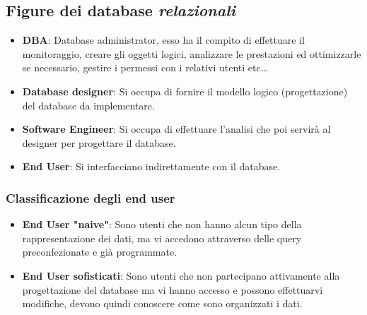 \documentclass[a4paper,12pt]{report}
\begin{document}
\subsection{Figure dei database \textit{relazionali}}
\begin{itemize}
	\item \textbf{DBA}: Database administrator, esso ha il compito di effettuare il monitoraggio, creare gli oggetti logici, analizzare le prestazioni ed ottimizzarle se necessario, gestire i permessi con i relativi utenti etc\dots
	\item \textbf{Database designer}: Si occupa di fornire il modello logico (progettazione) del database da implementare.
	\item \textbf{Software Engineer}: Si occupa di effettuare l'analisi che poi servirà al designer per progettare il database.
	\item \textbf{End User}: Si interfacciano indirettamente con il database.
\end{itemize}
\subsubsection{Classificazione degli end user}
\begin{itemize}
	\item \textbf{End User "naive"}: Sono utenti che non hanno alcun tipo della rappresentazione dei dati, ma vi accedono attraverso delle query preconfezionate e già programmate.
	\item \textbf{End User sofisticati}: Sono utenti che non partecipano attivamente alla progettazione del database ma vi hanno accesso e possono effettuarvi modifiche, devono quindi conoscere come sono organizzati i dati.
\end{itemize}
\end{document}
